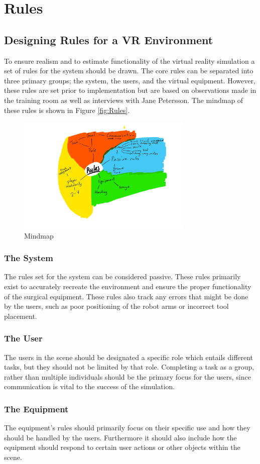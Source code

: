 \chapter*{Rules}
\section*{Designing Rules for a VR Environment}

To ensure realism and to estimate functionality of the virtual reality simulation a set of rules for the system should be drawn. The core rules can be separated into three primary groups; the system, the users, and the virtual equipment. However, these rules are set prior to implementation but are based on observations made in the training room as well as interviews with Jane Petersson. The mindmap of these rules is shown in Figure  \autoref{fig:Rules}.

\begin{figure}[H]
\centering
\includegraphics[width=0.75\textwidth]{WorksheetRules/BSR}
\caption{Mindmap}
\label{fig:Rules}
\end{figure}

\subsection*{The System}
The rules set for the system can be considered passive. These rules primarily exist to accurately recreate the environment and ensure the proper functionality of the surgical equipment. These rules also track any errors that might be done by the users, such as poor positioning of the robot arms or incorrect tool placement.

\subsection*{The User}
The users in the scene should be designated a specific role which entails different tasks, but they should not be limited by that role. Completing a task as a group, rather than multiple individuals should be the primary focus for the users, since communication is vital to the success of the simulation.

\subsection*{The Equipment}
The equipment's rules should primarily focus on their specific use and how they should be handled by the users. Furthermore it should also include how the equipment should respond to certain user actions or other objects within the scene.
